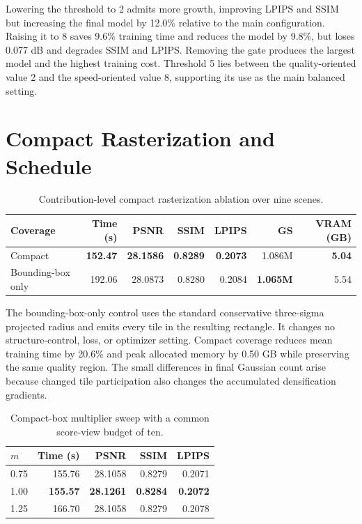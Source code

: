 Lowering the threshold to 2 admits more growth, improving LPIPS and SSIM but
increasing the final model by 12.0\% relative to the main configuration.
Raising it to 8 saves 9.6\% training time and reduces the model by 9.8\%, but
loses 0.077 dB and degrades SSIM and LPIPS. Removing the gate produces the
largest model and the highest training cost. Threshold 5 lies between the
quality-oriented value 2 and the speed-oriented value 8, supporting its use as
the main balanced setting.

\section{Compact Rasterization and Schedule}

\begin{table}[H]
\centering
\caption{Contribution-level compact rasterization ablation over nine scenes.}
\label{tab:compact-on-off}
\begin{tabular}{lrrrrrr}
\toprule
Coverage & Time (s) & PSNR & SSIM & LPIPS & GS & VRAM (GB) \\
\midrule
Compact & \textbf{152.47} & \textbf{28.1586} & \textbf{0.8289} & \textbf{0.2073} & 1.086M & \textbf{5.04} \\
Bounding-box only & 192.06 & 28.0873 & 0.8280 & 0.2084 & \textbf{1.065M} & 5.54 \\
\bottomrule
\end{tabular}
\end{table}

The bounding-box-only control uses the standard conservative three-sigma projected
radius and emits every tile in the resulting rectangle. It changes no
structure-control, loss, or optimizer setting. Compact coverage reduces mean
training time by 20.6\% and peak allocated memory by 0.50 GB while preserving
the same quality region. The small differences in final Gaussian count arise
because changed tile participation also changes the accumulated
densification gradients.

\begin{table}[H]
\centering
\caption{Compact-box multiplier sweep with a common score-view budget of ten.}
\label{tab:compact-ablation}
\begin{tabular}{lrrrr}
\toprule
$m$ & Time (s) & PSNR & SSIM & LPIPS \\
\midrule
0.75 & 155.76 & 28.1058 & 0.8279 & 0.2071 \\
1.00 & \textbf{155.57} & \textbf{28.1261} & \textbf{0.8284} & \textbf{0.2072} \\
1.25 & 166.70 & 28.1058 & 0.8279 & 0.2078 \\
\bottomrule
\end{tabular}
\end{table}

